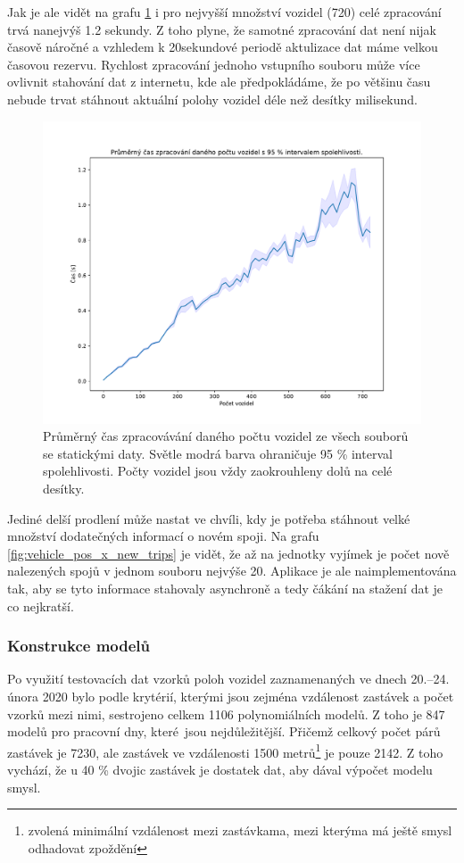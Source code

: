 Jak je ale vidět na grafu \ref{fig:file_process_time} i pro nejvyšší množství vozidel (720) celé zpracování trvá nanejvýš 1.2 sekundy. Z toho plyne, že samotné zpracování dat není nijak časově náročné a vzhledem k 20sekundové periodě aktulizace dat máme velkou časovou rezervu. Rychlost zpracování jednoho vstupního souboru může více ovlivnit stahování dat z internetu, kde ale předpokládáme, že po většinu času nebude trvat stáhnout aktuální polohy vozidel déle než desítky milisekund.

\bigbreak

\begin{figure}
	\centering
  \includegraphics[width=0.7\linewidth]{../img/file_process_time}
  \caption{Průměrný čas zpracovávání daného počtu vozidel ze všech souborů se statickými daty. Světle modrá barva ohraničuje 95 \% interval spolehlivosti. Počty vozidel jsou vždy zaokrouhleny dolů na celé desítky.}
  \label{fig:file_process_time}
\end{figure}

\bigbreak

Jediné delší prodlení může nastat ve chvíli, kdy je potřeba stáhnout velké množství dodatečných informací o novém spoji. Na grafu \ref{fig:vehicle_pos_x_new_trips} je vidět, že až na jednotky vyjímek je počet nově nalezených spojů v jednom souboru nejvýše 20. Aplikace je ale naimplementována tak, aby se tyto informace stahovaly asynchroně a tedy čákání na stažení dat je co nejkratší.

\subsubsection{Konstrukce modelů}

Po využití testovacích dat vzorků poloh vozidel zaznamenaných ve dnech 20.--24. února 2020 bylo podle krytérií, kterými jsou zejména vzdálenost zastávek a počet vzorků mezi nimi, sestrojeno celkem 1106 polynomiálních modelů. Z toho je 847 modelů pro pracovní dny, které jsou nejdůležitější. Přičemž celkový počet párů zastávek je 7230, ale zastávek ve vzdálenosti 1500 metrů\footnote{zvolená minimální vzdálenost mezi zastávkama, mezi kterýma má ještě smysl odhadovat zpoždění} je pouze 2142. Z toho vychází, že u 40 \% dvojic zastávek je dostatek dat, aby dával výpočet modelu smysl.

